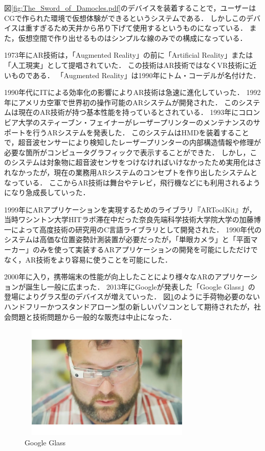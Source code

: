 \documentclass[12pt,a4j]{ltjsarticle}
\begin{document}
図\ref{fig:The_Sword_of_Damocles.pdf}のデバイスを装着することで，ユーザーはCGで作られた環境で仮想体験ができるというシステムである．
しかしこのデバイスは重すぎるため天井から吊り下げて使用するというものになっている．
また，仮想空間で作り出せるものはシンプルな線のみでの構成になっている．

1973年にAR技術は，「Augmented Reality」の前に「Artificial Reality」または「人工現実」として提唱されていた．
この技術はAR技術ではなくVR技術に近いものである．
「Augmented Reality」は1990年にトム・コーデルが名付けた．

1990年代にITによる効率化の影響によりAR技術は急速に進化していった．
1992年にアメリカ空軍で世界初の操作可能のARシステムが開発された．
このシステムは現在のAR技術が持つ基本性能を持っているとされている．
1993年にコロンビア大学のスティーブン・フェイナーがレーザープリンターのメンテナンスのサポートを行うARシステムを発表した．
このシステムはHMDを装着することで，超音波センサーにより検知したレーザープリンターの内部構造情報や修理が必要な箇所がコンピュータグラフィックで表示することができた．
しかし，このシステムは対象物に超音波センサをつけなければいけなかったため実用化はされなかったが，現在の業務用ARシステムのコンセプトを作り出したシステムとなっている．
ここからAR技術は舞台やテレビ，飛行機などにも利用されるようになり急成長していった．

1999年にARアプリケーションを実現するためのライブラリ『ARToolKit』が，当時ワシントン大学HITラボ滞在中だった奈良先端科学技術大学院大学の加藤博一によって高度技術の研究用のC言語ライブラリとして開発された．
1990年代のシステムは高価な位置姿勢計測装置が必要だったが，「単眼カメラ」と「平面マーカー」のみを使って実装するARアプリケーションの開発を可能にしただけでなく，AR技術をより容易に使うことを可能にした．

2000年に入り，携帯端末の性能が向上したことにより様々なARのアプリケーションが誕生し一般に広まった．
2013年にGoogleが発表した「Google Glass」の登場によりグラス型のデバイスが増えていった．
図\ref{fig:Google_Glass.pdf}のように手荷物必要のないハンドフリーかつスタンドアローン型の新しいパソコンとして期待されたが，社会問題と技術問題から一般的な販売は中止になった\cite{ARの歴史}．

\begin{figure}[h]
\begin{center}
 \includegraphics[clip,width=85mm,height=55mm]{Google_Glass.pdf}
\end{center}
 \caption{Google Glass}
 \label{fig:Google_Glass.pdf}
\end{figure}
\end{document}
